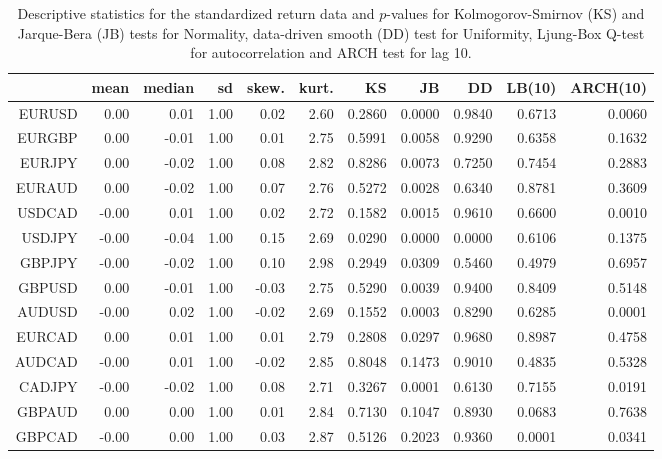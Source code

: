 \begin{table}[ht]
\centering
\begin{tabular}{rrrrrrrrrrr}
  \hline
 & mean & median & sd & skew. & kurt. & KS & JB & DD & LB(10) & ARCH(10) \\ 
  \hline
EURUSD & 0.00 & 0.01 & 1.00 & 0.02 & 2.60 & 0.2860 & 0.0000 & 0.9840 & 0.6713 & 0.0060 \\ 
  EURGBP & 0.00 & -0.01 & 1.00 & 0.01 & 2.75 & 0.5991 & 0.0058 & 0.9290 & 0.6358 & 0.1632 \\ 
  EURJPY & 0.00 & -0.02 & 1.00 & 0.08 & 2.82 & 0.8286 & 0.0073 & 0.7250 & 0.7454 & 0.2883 \\ 
  EURAUD & 0.00 & -0.02 & 1.00 & 0.07 & 2.76 & 0.5272 & 0.0028 & 0.6340 & 0.8781 & 0.3609 \\ 
  USDCAD & -0.00 & 0.01 & 1.00 & 0.02 & 2.72 & 0.1582 & 0.0015 & 0.9610 & 0.6600 & 0.0010 \\ 
  USDJPY & -0.00 & -0.04 & 1.00 & 0.15 & 2.69 & 0.0290 & 0.0000 & 0.0000 & 0.6106 & 0.1375 \\ 
  GBPJPY & -0.00 & -0.02 & 1.00 & 0.10 & 2.98 & 0.2949 & 0.0309 & 0.5460 & 0.4979 & 0.6957 \\ 
  GBPUSD & 0.00 & -0.01 & 1.00 & -0.03 & 2.75 & 0.5290 & 0.0039 & 0.9400 & 0.8409 & 0.5148 \\ 
  AUDUSD & -0.00 & 0.02 & 1.00 & -0.02 & 2.69 & 0.1552 & 0.0003 & 0.8290 & 0.6285 & 0.0001 \\ 
  EURCAD & 0.00 & 0.01 & 1.00 & 0.01 & 2.79 & 0.2808 & 0.0297 & 0.9680 & 0.8987 & 0.4758 \\ 
  AUDCAD & -0.00 & 0.01 & 1.00 & -0.02 & 2.85 & 0.8048 & 0.1473 & 0.9010 & 0.4835 & 0.5328 \\ 
  CADJPY & -0.00 & -0.02 & 1.00 & 0.08 & 2.71 & 0.3267 & 0.0001 & 0.6130 & 0.7155 & 0.0191 \\ 
  GBPAUD & 0.00 & 0.00 & 1.00 & 0.01 & 2.84 & 0.7130 & 0.1047 & 0.8930 & 0.0683 & 0.7638 \\ 
  GBPCAD & -0.00 & 0.00 & 1.00 & 0.03 & 2.87 & 0.5126 & 0.2023 & 0.9360 & 0.0001 & 0.0341 \\ 
   \hline
\end{tabular}
\caption{Descriptive statistics for the standardized return data and
              $p$-values for Kolmogorov-Smirnov (KS) and 
             Jarque-Bera (JB) tests for Normality,
             data-driven smooth (DD) test for Uniformity, 
             Ljung-Box Q-test for autocorrelation and ARCH test for lag 10.} 
\label{table:standrets_desc_FX}
\end{table}
